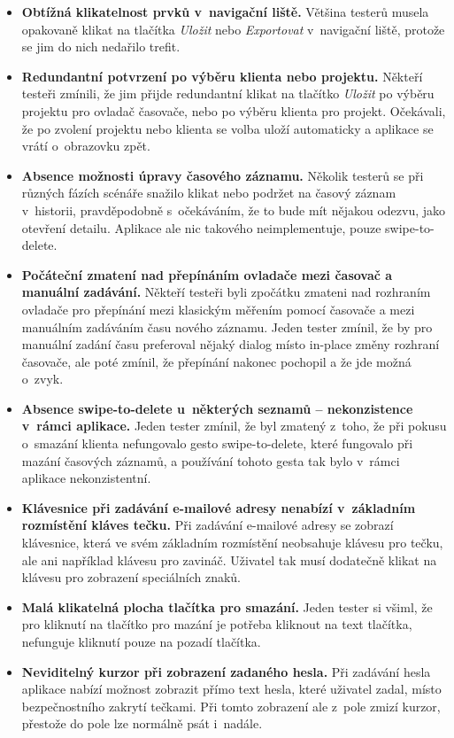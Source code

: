 \begin{itemize}
\item\textbf{Obtížná klikatelnost prvků v~navigační liště.} Většina testerů musela opakovaně klikat na tlačítka \emph{Uložit} nebo \emph{Exportovat} v~navigační liště, protože se jim do nich nedařilo trefit.
\item\textbf{Redundantní potvrzení po výběru klienta nebo projektu.} Někteří testeři zmínili, že jim přijde redundantní klikat na tlačítko \emph{Uložit} po výběru projektu pro ovladač časovače, nebo po výběru klienta pro projekt. Očekávali, že po zvolení projektu nebo klienta se volba uloží automaticky a aplikace se vrátí o~obrazovku zpět.
\item\textbf{Absence možnosti úpravy časového záznamu.} Několik testerů se při různých fázích scénáře snažilo klikat nebo podržet na časový záznam v~historii, pravděpodobně s~očekáváním, že to bude mít nějakou odezvu, jako otevření detailu. Aplikace ale nic takového neimplementuje, pouze swipe-to-delete.
\item\textbf{Počáteční zmatení nad přepínáním ovladače mezi časovač a manuální zadávání.} Někteří testeři byli zpočátku zmateni nad rozhraním ovladače pro přepínání mezi klasickým měřením pomocí časovače a mezi manuálním zadáváním času nového záznamu. Jeden tester zmínil, že by pro manuální zadání času preferoval nějaký dialog místo in-place změny rozhraní časovače, ale poté zmínil, že přepínání nakonec pochopil a že jde možná o~zvyk.
\item\textbf{Absence swipe-to-delete u~některých seznamů – nekonzistence v~rámci aplikace.} Jeden tester zmínil, že byl zmatený z~toho, že při pokusu o~smazání klienta nefungovalo gesto swipe-to-delete, které fungovalo při mazání časových záznamů, a používání tohoto gesta tak bylo v~rámci aplikace nekonzistentní.
\item\textbf{Klávesnice při zadávání e-mailové adresy nenabízí v~základním rozmístění kláves tečku.} Při zadávání e-mailové adresy se zobrazí klávesnice, která ve svém základním rozmístění neobsahuje klávesu pro tečku, ale ani například klávesu pro zavináč. Uživatel tak musí dodatečně klikat na klávesu pro zobrazení speciálních znaků.
\item\textbf{Malá klikatelná plocha tlačítka pro smazání.} Jeden tester si všiml, že pro kliknutí na tlačítko pro mazání je potřeba kliknout na text tlačítka, nefunguje kliknutí pouze na pozadí tlačítka.
\item\textbf{Neviditelný kurzor při zobrazení zadaného hesla.} Při zadávání hesla aplikace nabízí možnost zobrazit přímo text hesla, které uživatel zadal, místo bezpečnostního zakrytí tečkami. Při tomto zobrazení ale z~pole zmizí kurzor, přestože do pole lze normálně psát i~nadále.

\end{itemize}
